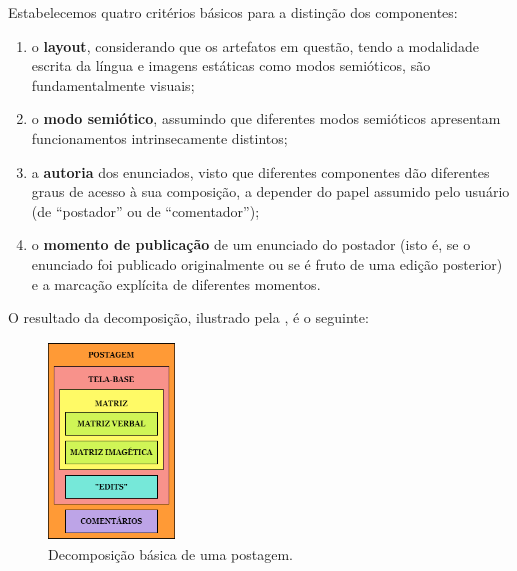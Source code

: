 \documentclass{textolivre}
\begin{document}
Estabelecemos quatro critérios básicos para a distinção dos componentes:
\begin{enumerate}[label=\roman*.,ref=\roman*]
\item \label{itm01} o \textbf{layout}, considerando que os artefatos em questão, tendo a modalidade escrita da língua e imagens estáticas como modos semióticos, são fundamentalmente visuais;
\item \label{itm02} o \textbf{modo semiótico}, assumindo que diferentes modos semióticos apresentam funcionamentos intrinsecamente distintos;
\item \label{itm03} a \textbf{autoria} dos enunciados, visto que diferentes componentes dão diferentes graus de acesso à sua composição, a depender do papel assumido pelo usuário (de “postador” ou de “comentador”);
\item \label{itm04} o \textbf{momento de publicação} de um enunciado do postador (isto é, se o enunciado foi publicado originalmente ou se é fruto de uma edição posterior) e a marcação explícita de diferentes momentos.
\end{enumerate}

O resultado da decomposição, ilustrado pela , é o seguinte:

\begin{figure}[htbp]
 \centering
 \includegraphics[width=0.3\textwidth]{fig02}
 \caption{Decomposição básica de uma postagem.}
 \label{fig02}
\end{figure}
\end{document}
